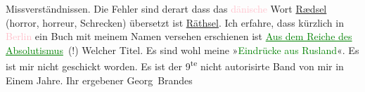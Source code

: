                     Missverständnissen. Die Fehler sind derart dass das \textcolor{pink}{dänische}{}\ledrightnote{\textcolor{pink}{Dänemark}} Wort \uline{Rædsel} (horror,
                    horreur, Schrecken) übersetzt ist \uline{Räthsel}.\hspace*{5em} Ich erfahre, dass kürzlich in \textcolor{pink}{Berlin}{}\ledrightnote{\textcolor{pink}{Berlin}} ein Buch mit meinem Namen versehen erschienen ist
                        \textcolor{green}{\uline{Aus dem Reiche des Absolutismus}}{}\ledrightnote{\textcolor{green}{Eindrücke aus Russland}} (!)
                    Welcher Titel. Es sind wohl meine »\textcolor{green}{Eindrücke aus
                        Rusland}{}\ledrightnote{\textcolor{green}{Eindrücke aus Russland}}«. Es ist mir nicht geschickt worden. \introOben{}Es ist
                        der 9\textsuperscript{te} nicht autorisirte Band von mir in Einem
                        Jahre.\introOben{}\pend
           \pstart Ihr ergebener \spacefill\mbox{Georg Brandes}\pend{}\endnumbering{}  
      